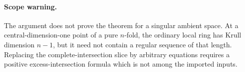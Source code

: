 \paragraph{Scope warning.}
The argument does not prove the theorem for a singular ambient space.  At a
central-dimension-one point of a pure $n$-fold, the ordinary local ring has
Krull dimension $n-1$, but it need not contain a regular sequence of that
length.  Replacing the complete-intersection slice by arbitrary equations
requires a positive excess-intersection formula which is not among the
imported inputs.
